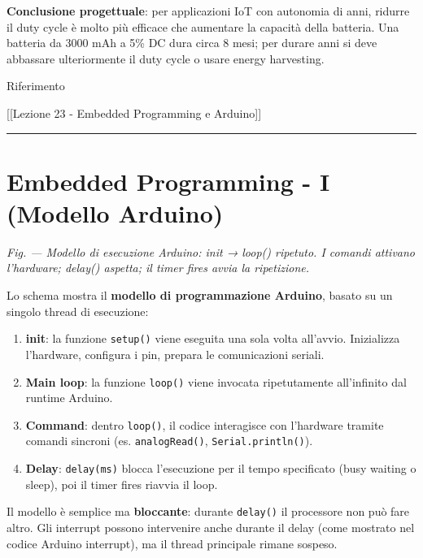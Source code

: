 \documentclass[
  italian,
  openany]{book}
\providecommand{\tightlist}{%
  \setlength{\itemsep}{0pt}\setlength{\parskip}{0pt}}
\begin{document}
\textbf{Conclusione progettuale}: per applicazioni IoT con autonomia di
anni, ridurre il duty cycle è molto più efficace che aumentare la
capacità della batteria. Una batteria da 3000 mAh a 5\% DC dura circa 8
mesi; per durare anni si deve abbassare ulteriormente il duty cycle o
usare energy harvesting.

\begin{calloutnote}{Riferimento}

{[}{[}Lezione 23 - Embedded Programming e Arduino{]}{]}

\end{calloutnote}

\begin{center}\rule{0.5\linewidth}{0.5pt}\end{center}

\section{Embedded Programming - I (Modello
Arduino)}\label{embedded-programming---i-modello-arduino}

\emph{Fig. --- Modello di esecuzione Arduino: init → loop() ripetuto. I
comandi attivano l'hardware; delay() aspetta; il timer fires avvia la
ripetizione.}

Lo schema mostra il \textbf{modello di programmazione Arduino}, basato
su un singolo thread di esecuzione:

\begin{enumerate}
\def\labelenumi{\arabic{enumi}.}
\tightlist
\item
  \textbf{init}: la funzione \texttt{setup()} viene eseguita una sola
  volta all'avvio. Inizializza l'hardware, configura i pin, prepara le
  comunicazioni seriali.
\item
  \textbf{Main loop}: la funzione \texttt{loop()} viene invocata
  ripetutamente all'infinito dal runtime Arduino.
\item
  \textbf{Command}: dentro \texttt{loop()}, il codice interagisce con
  l'hardware tramite comandi sincroni (es. \texttt{analogRead()},
  \texttt{Serial.println()}).
\item
  \textbf{Delay}: \texttt{delay(ms)} blocca l'esecuzione per il tempo
  specificato (busy waiting o sleep), poi il timer fires riavvia il
  loop.
\end{enumerate}

Il modello è semplice ma \textbf{bloccante}: durante \texttt{delay()} il
processore non può fare altro. Gli interrupt possono intervenire anche
durante il delay (come mostrato nel codice Arduino interrupt), ma il
thread principale rimane sospeso.
\end{document}
